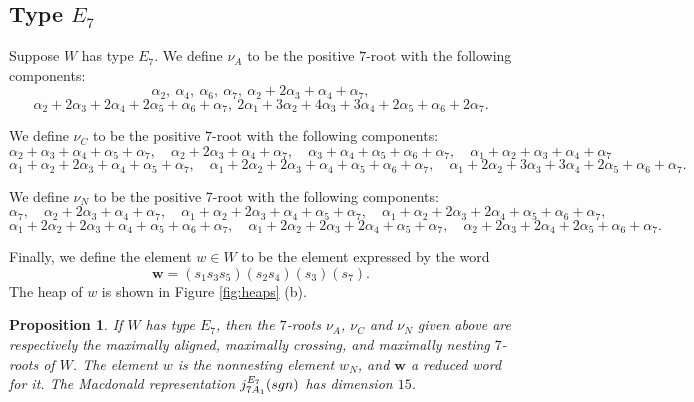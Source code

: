 \documentclass[11pt]{amsart}
\theoremstyle{plain}
\newtheorem{prop}[theorem]{Proposition}
\theoremstyle{definition}
\theoremstyle{remark}
\numberwithin{equation}{subsection}
\newcommand{\al}{\alpha}
\newcommand{\bfw}{\mathbf{w}}
\newcommand{\macd}[2]{j^{#1}_{#2}({\rm{sgn}})}
\begin{document}
\subsection{Type \texorpdfstring{$E_7$}{E7}}
\label{sec:e7}
Suppose $W$ has type $E_7$.  We define $\nu_A$ to be the positive $7$-root with
the following components: \[ \al_2, \ \al_4, \ \al_6, \ \al_7, \ \al_2 +
2\al_3 + \al_4 + \al_7, \] \[ \al_2 + 2\al_3 + 2\al_4 + 2\al_5 + \al_6 + \al_7,
    \ 2\al_1 + 3\al_2 + 4\al_3 + 3\al_4 + 2\al_5 + \al_6 + 2\al_7 .\]

We define $\nu_C$ to be the positive $7$-root with the following components: \[
    \alpha_2 + \alpha_3 + \alpha_4 + \alpha_5 + \alpha_7,\quad \alpha_2 +
    2\alpha_3 + \alpha_4 + \alpha_7,\quad           \alpha_3 + \alpha_4 +
    \alpha_5 + \alpha_6 + \alpha_7,\quad        \alpha_1 + \alpha_2 + \alpha_3 +
\alpha_4 + \alpha_7 \] \[ \alpha_1 + \alpha_2 + 2\alpha_3 + \alpha_4 + \alpha_5
    + \alpha_7,\quad   \alpha_1 + 2\alpha_2 + 2\alpha_3 + \alpha_4 + \alpha_5 +
    \alpha_6 + \alpha_7,\quad    \alpha_1 + 2\alpha_2 + 3\alpha_3 + 3\alpha_4 +
2\alpha_5 + \alpha_6 + \alpha_7.  \]

We define $\nu_N$ to be the positive 7-root with the following components: $$
\alpha_7,\quad \alpha_2 + 2\alpha_3 + \alpha_4 + \alpha_7,\quad \alpha_1 +
\alpha_2 + 2\alpha_3 + \alpha_4 + \alpha_5 + \alpha_7,\quad \alpha_1 + \alpha_2
+ 2\alpha_3 + 2\alpha_4 + \alpha_5 + \alpha_6 + \alpha_7, $$ $$ \alpha_1 +
2\alpha_2 + 2\alpha_3 + \alpha_4 + \alpha_5 + \alpha_6 + \alpha_7, \quad
\alpha_1 + 2\alpha_2 + 2\alpha_3 + 2\alpha_4 + \alpha_5 + \alpha_7,\quad
\alpha_2 + 2\alpha_3 + 2\alpha_4 + 2\alpha_5 + \alpha_6 + \alpha_7 .$$

Finally, we define the element $w\in W$ to be the element expressed by the word
$$\bfw = (s_1s_3s_5)(s_2s_4)(s_3)(s_7).$$ The heap of $w$ is shown in Figure
\ref{fig:heaps} (b).


\begin{prop}\label{prop:e7answer}
If $W$ has type $E_7$, then the $7$-roots $\nu_A$, $\nu_C$ and $\nu_N$ given
above are  respectively the maximally aligned, maximally crossing, and maximally
nesting $7$-roots of $W$.  The element $w$ is the nonnesting element $w_N$, and $\bfw$
a reduced word for it.  The Macdonald representation $\macd{E_7}{7A_1}$ has
dimension $15$.
\end{prop}
\end{document}
